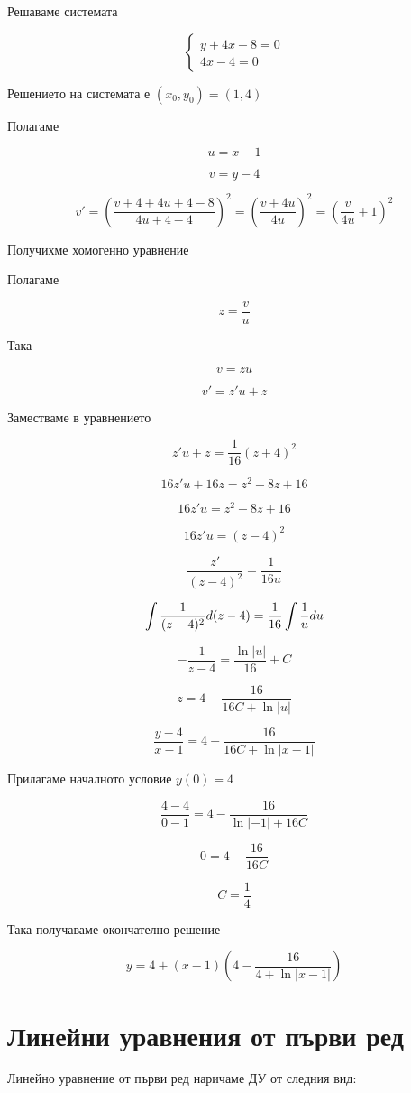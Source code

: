 \documentclass{scrartcl}
\begin{document}
Решаваме системата

$$
\begin{cases}
y+4x-8=0\\
4x-4 = 0
\end{cases}
$$

Решението на системата е $(x_0, y_0) = (1, 4)$

Полагаме

$$u = x-1$$

$$v = y - 4$$

$$v' = \left(\dfrac{v+4+4u+4-8}{4u+4-4}\right)^2 = \left(\dfrac{v+4u}{4u}\right)^2 = \left(\dfrac{v}{4u}+1\right)^2$$

Получихме хомогенно уравнение

Полагаме

$$z = \dfrac{v}{u}$$

Така

$$v = zu$$

$$v' = z'u + z$$

Заместваме в уравнението

$$z'u + z = \dfrac{1}{16}(z+4)^2$$

$$16z'u + 16z = z^2+8z+16$$

$$16z'u = z^2-8z+16$$

$$16z'u = (z-4)^2$$

$$\dfrac{z'}{(z-4)^2} = \dfrac{1}{16u}$$

$$\displaystyle \int\dfrac{1}{(z-4)^2}\space d(z-4) = \dfrac{1}{16}\int\dfrac{1}{u}\space du$$

$$-\dfrac{1}{z-4} = \dfrac{\ln{|u|}}{16} + C$$

$$z = 4 - \dfrac{16}{16C+\ln{|u|}}$$

$$\dfrac{y-4}{x-1} = 4-\dfrac{16}{16C+\ln{|x-1|}}$$

Прилагаме началното условие $y(0) = 4$

$$\dfrac{4-4}{0-1} = 4 - \dfrac{16}{\ln{|-1|} + 16C}$$

$$0 = 4-\dfrac{16}{16C}$$

$$C = \dfrac{1}{4}$$

Така получаваме окончателно решение

$$y = 4 + (x-1)\left(4-\dfrac{16}{4+\ln{|x-1|}}\right)$$

\section{Линейни уравнения от първи ред}

Линейно уравнение от първи ред наричаме ДУ от следния вид:
\end{document}
